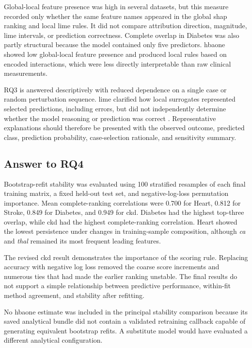Global-local feature presence was high in several datasets, but this measure recorded only whether the same feature names appeared in the global \gls{shap} ranking and local \gls{lime} rules. It did not compare attribution direction, magnitude, \gls{lime} intervals, or prediction correctness. Complete overlap in Diabetes was also partly structural because the model contained only five predictors. \gls{hbaone} showed low global-local feature presence and produced local rules based on encoded interactions, which were less directly interpretable than raw clinical measurements.

RQ3 is answered descriptively with reduced dependence on a single case or random perturbation sequence. \gls{lime} clarified how local surrogates represented selected predictions, including errors, but did not independently determine whether the model reasoning or prediction was correct \citep{ribeiro_why_2016, vilone_classification_2021}. Representative explanations should therefore be presented with the observed outcome, predicted class, prediction probability, case-selection rationale, and sensitivity summary.

\subsection{Answer to RQ4}

Bootstrap-refit stability was evaluated using 100 stratified resamples of each final training matrix, a fixed held-out test set, and negative-log-loss permutation importance. Mean complete-ranking correlations were 0.700 for Heart, 0.812 for Stroke, 0.849 for Diabetes, and 0.949 for \gls{ckd}. Diabetes had the highest top-three overlap, while \gls{ckd} had the highest complete-ranking correlation. Heart showed the lowest persistence under changes in training-sample composition, although \emph{ca} and \emph{thal} remained its most frequent leading features.

The revised \gls{ckd} result demonstrates the importance of the scoring rule. Replacing accuracy with negative log loss removed the coarse score increments and numerous ties that had made the earlier ranking unstable. The final results do not support a simple relationship between predictive performance, within-fit method agreement, and stability after refitting.

No \gls{hbaone} estimate was included in the principal stability comparison because its saved analytical bundle did not contain a validated retraining callback capable of generating equivalent bootstrap refits. A substitute model would have evaluated a different analytical configuration.

